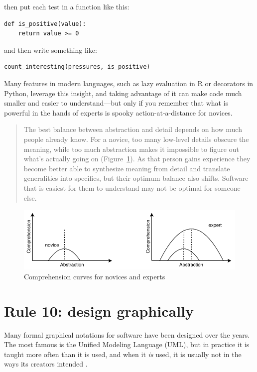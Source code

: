 \documentclass[10pt,letterpaper]{article}
\begin{document}
\noindent
then put each test in a function like this:

\begin{lstlisting}
def is_positive(value):
    return value >= 0
\end{lstlisting}

\noindent
and then write something like:

\begin{lstlisting}
count_interesting(pressures, is_positive)
\end{lstlisting}

Many features in modern languages,
such as lazy evaluation in R or decorators in Python,
leverage this insight,
and taking advantage of it can make code much smaller
and easier to understand---but only if you remember that
what is powerful in the hands of experts is spooky action-at-a-distance for novices.

\begin{quotation}
  The best balance between abstraction and detail
  depends on how much people already know.
  For a novice,
  too many low-level details obscure the meaning,
  while too much abstraction makes it impossible to figure out what's actually going on
  (Figure~\ref{comprehension}).
  As that person gains experience
  they become better able to synthesize meaning from detail
  and translate generalities into specifics,
  but their optimum balance also shifts.
  Software that is easiest for them to understand may not be optimal for someone else.
\end{quotation}

\begin{figure}
  \centering
  \includegraphics{comprehension.pdf}
  \caption{Comprehension curves for novices and experts}
  \label{comprehension}
\end{figure}

\section*{Rule 10: design graphically}

Many formal graphical notations for software have been designed over the years.
The most famous is the Unified Modeling Language (UML),
but in practice it is taught more often than it is used,
and when it \emph{is} used,
it is usually not in the ways its creators intended \cite{Petre2013}.
\end{document}
